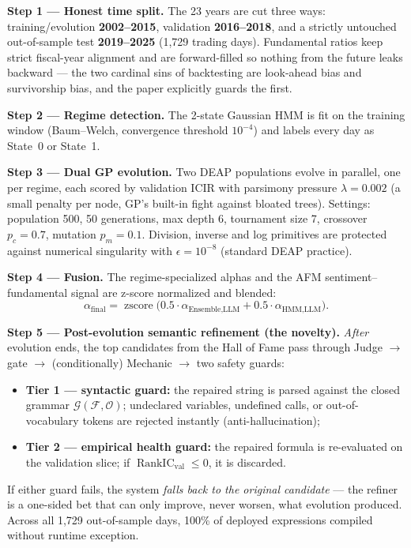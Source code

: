 \documentclass[11pt,a4paper]{article}
\begin{document}
\textbf{Step 1 --- Honest time split.} The 23 years are cut three ways:
training/evolution \textbf{2002--2015}, validation \textbf{2016--2018}, and a
strictly untouched out-of-sample test \textbf{2019--2025} (1{,}729 trading
days). Fundamental ratios keep strict fiscal-year alignment and are
forward-filled so nothing from the future leaks backward --- the two cardinal
sins of backtesting are look-ahead bias and survivorship bias, and the paper
explicitly guards the first.

\textbf{Step 2 --- Regime detection.} The 2-state Gaussian HMM is fit on the
training window (Baum--Welch, convergence threshold $10^{-4}$) and labels every
day as State~0 or State~1.

\textbf{Step 3 --- Dual GP evolution.} Two DEAP populations evolve in
parallel, one per regime, each scored by validation ICIR with parsimony
pressure $\lambda = 0.002$ (a small penalty per node, GP's built-in fight
against bloated trees). Settings: population 500, 50 generations, max depth 6,
tournament size 7, crossover $p_c = 0.7$, mutation $p_m = 0.1$. Division,
inverse and log primitives are protected against numerical singularity with
$\epsilon = 10^{-8}$ (standard DEAP practice).

\textbf{Step 4 --- Fusion.} The regime-specialized alphas and the AFM
sentiment--fundamental signal are z-score normalized and blended:
\begin{equation}
  \alpha_{\text{final}} =
  \operatorname{zscore}\bigl(
    0.5\cdot\alpha_{\text{Ensemble,LLM}} +
    0.5\cdot\alpha_{\text{HMM,LLM}}
  \bigr).
  \label{eq:blend}
\end{equation}

\textbf{Step 5 --- Post-evolution semantic refinement (the novelty).}
\emph{After} evolution ends, the top candidates from the Hall of Fame pass
through Judge $\rightarrow$ gate $\rightarrow$ (conditionally) Mechanic
$\rightarrow$ two safety guards:
\begin{itemize}
  \item \textbf{Tier 1 --- syntactic guard:} the repaired string is parsed
  against the closed grammar $\mathcal{G}(\mathcal{F},\mathcal{O})$;
  undeclared variables, undefined calls, or out-of-vocabulary tokens are
  rejected instantly (anti-hallucination);
  \item \textbf{Tier 2 --- empirical health guard:} the repaired formula is
  re-evaluated on the validation slice; if
  $\operatorname{RankIC}_{\text{val}} \le 0$, it is discarded.
\end{itemize}
If either guard fails, the system \emph{falls back to the original
candidate} --- the refiner is a one-sided bet that can only improve, never
worsen, what evolution produced. Across all 1{,}729 out-of-sample days, 100\%
of deployed expressions compiled without runtime exception.
\end{document}
